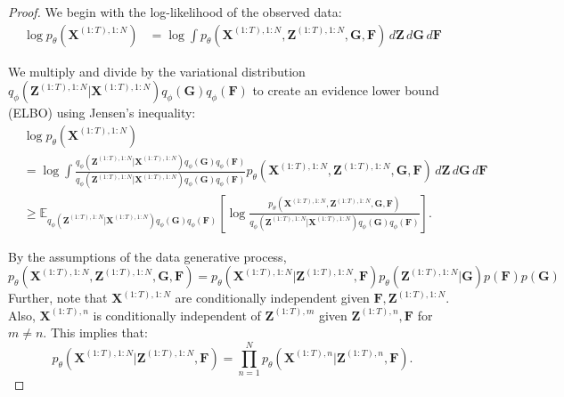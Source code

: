 \begin{proof}

We begin with the log-likelihood of the observed data:
\begin{align*}
    \log p_{\theta} \left( \mathbf{X}^{(1:T), 1:N} \right)
    &= \log \int p_{\theta}\left( \mathbf{X}^{(1:T), 1:N}, \mathbf{Z}^{(1:T), 1:N}, \mathbf{G}, \mathbf{F} \right) \, d\mathbf{Z} \, d\mathbf{G} \, d\mathbf{F}
\end{align*}

We multiply and divide by the variational distribution $q_{\phi} \left( \mathbf{Z}^{(1:T), 1:N} | \mathbf{X}^{(1:T), 1:N} \right) q_{\phi} \left(\mathbf{G}\right) q_{\phi} \left( \mathbf{F}\right)$ to create an evidence lower bound (ELBO) using Jensen's inequality:
\begin{align}
    &\log p_{\theta} \left( \mathbf{X}^{(1:T), 1:N} \right) \nonumber \\ &= \log \int \frac{q_{\phi} \left( \mathbf{Z}^{(1:T), 1:N} | \mathbf{X}^{(1:T), 1:N} \right) q_{\phi} \left(\mathbf{G}\right) q_{\phi} \left( \mathbf{F}\right)}{q_{\phi} \left( \mathbf{Z}^{(1:T), 1:N} | \mathbf{X}^{(1:T), 1:N} \right) q_{\phi} \left(\mathbf{G}\right) q_{\phi} \left( \mathbf{F}\right)}  p_{\theta} \left( \mathbf{X}^{(1:T), 1:N}, \mathbf{Z}^{(1:T), 1:N}, \mathbf{G}, \mathbf{F} \right) \, d\mathbf{Z} \, d\mathbf{G} \, d\mathbf{F} \nonumber \\
    & \geq \mathbb{E}_{q_{\phi} \left( \mathbf{Z}^{(1:T), 1:N} | \mathbf{X}^{(1:T), 1:N} \right) q_{\phi} \left(\mathbf{G}\right) q_{\phi} \left( \mathbf{F}\right)} \left[ \log \frac{ p_{\theta} \left( \mathbf{X}^{(1:T), 1:N}, \mathbf{Z}^{(1:T), 1:N}, \mathbf{G}, \mathbf{F} \right) }{ q_{\phi} \left( \mathbf{Z}^{(1:T), 1:N} | \mathbf{X}^{(1:T), 1:N} \right) q_{\phi} \left(\mathbf{G}\right) q_{\phi} \left( \mathbf{F}\right) } \right]. \label{eqn:elbo_interm}
\end{align}

By the assumptions of the data generative process, 
\begin{equation*}
    p_{\theta} \left( \mathbf{X}^{(1:T), 1:N}, \mathbf{Z}^{(1:T), 1:N}, \mathbf{G}, \mathbf{F} \right)=  p_{\theta} \left( \mathbf{X}^{(1:T), 1:N} | \mathbf{Z}^{(1:T), 1:N}, \mathbf{F}\right) p_{\theta} \left(\mathbf{Z}^{(1:T), 1:N} | \mathbf{G} \right) p \left(\mathbf{F}\right) p\left( \mathbf{G}\right) 
\end{equation*}
Further, note that $\mathbf{X}^{(1:T), 1:N}$ are conditionally independent given $\mathbf{F}, \mathbf{Z}^{(1:T), 1:N}$. Also, $\mathbf{X}^{(1:T), n}$ is conditionally independent of $\mathbf{Z}^{(1:T), m}$ given $\mathbf{Z}^{(1:T), n}, \mathbf{F}$ for $m \neq n$. This implies that:
\begin{equation*}
    p_{\theta} \left( \mathbf{X}^{(1:T), 1:N} | \mathbf{Z}^{(1:T), 1:N}, \mathbf{F}\right) = \prod_{n=1}^N p_\theta \left( \mathbf{X}^{(1:T), n} | \mathbf{Z}^{(1:T), n}, \mathbf{F} \right).
\end{equation*}


\end{proof}
